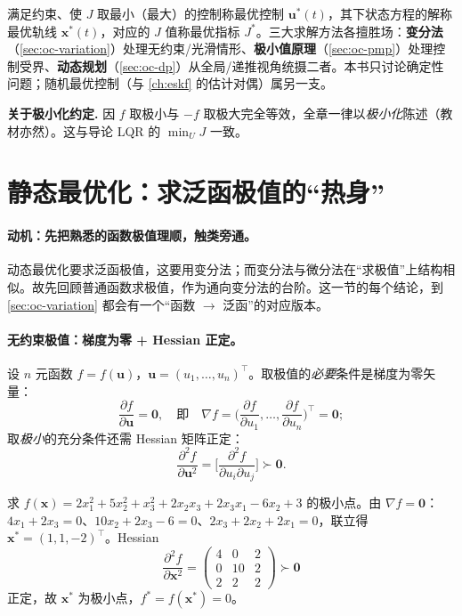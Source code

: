 \noindent 满足约束、使 $J$ 取最小（最大）的控制称最优控制 $\mathbf{u}^*(t)$，其下状态方程的解称最优轨线 $\mathbf{x}^*(t)$，对应的 $J$ 值称最优指标 $J^*$。三大求解方法各擅胜场：\textbf{变分法}（\cref{sec:oc-variation}）处理无约束/光滑情形、\textbf{极小值原理}（\cref{sec:oc-pmp}）处理控制受界、\textbf{动态规划}（\cref{sec:oc-dp}）从全局/递推视角统摄二者。本书只讨论确定性问题；随机最优控制（与 \cref{ch:eskf} 的估计对偶）属另一支。

\begin{note}
\textbf{关于极小化约定.}\; 因 $f$ 取极小与 $-f$ 取极大完全等效，全章一律以\emph{极小化}陈述（教材亦然）。这与导论 LQR 的 $\min_U J$ 一致。
\end{note}

\section{静态最优化：求泛函极值的“热身”}
\label{sec:oc-static}

\paragraph{动机：先把熟悉的函数极值理顺，触类旁通。}
动态最优化要求泛函极值，这要用变分法；而变分法与微分法在“求极值”上结构相似。故先回顾普通函数求极值，作为通向变分法的台阶\cite{liubao2006modern}。这一节的每个结论，到 \cref{sec:oc-variation} 都会有一个“函数 $\to$ 泛函”的对应版本。

\paragraph{无约束极值：梯度为零 + Hessian 正定。}
设 $n$ 元函数 $f=f(\mathbf{u})$，$\mathbf{u}=(u_1,\dots,u_n)^\top$。取极值的\emph{必要}条件是梯度为零矢量：
\begin{equation}
  \frac{\partial f}{\partial\mathbf{u}}=\mathbf{0},\quad\text{即}\quad\nabla f=\Big(\frac{\partial f}{\partial u_1},\dots,\frac{\partial f}{\partial u_n}\Big)^\top=\mathbf{0};
  \label{eq:oc-grad-zero}
\end{equation}
取\emph{极小}的充分条件还需 Hessian 矩阵正定：
\begin{equation}
  \frac{\partial^2 f}{\partial\mathbf{u}^2}=\Big[\frac{\partial^2 f}{\partial u_i\partial u_j}\Big]\succ\mathbf{0}.
  \label{eq:oc-hessian}
\end{equation}

\begin{example}[多元函数极值]\label{ex:oc-static-quad}
求 $f(\mathbf{x})=2x_1^2+5x_2^2+x_3^2+2x_2x_3+2x_3x_1-6x_2+3$ 的极小点。由 $\nabla f=\mathbf{0}$：$4x_1+2x_3=0$、$10x_2+2x_3-6=0$、$2x_3+2x_2+2x_1=0$，联立得 $\mathbf{x}^*=(1,1,-2)^\top$。Hessian
\[
  \frac{\partial^2 f}{\partial\mathbf{x}^2}=\begin{pmatrix}4&0&2\\0&10&2\\2&2&2\end{pmatrix}\succ\mathbf{0}
\]
正定，故 $\mathbf{x}^*$ 为极小点，$f^*=f(\mathbf{x}^*)=0$。
\end{example}

